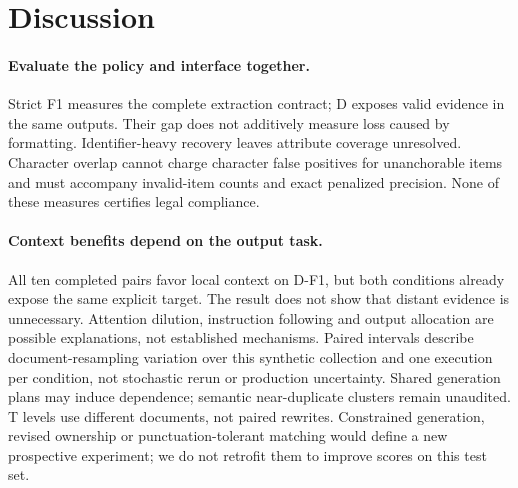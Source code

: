 \section{Discussion}
\label{sec:discussion}

\paragraph{Evaluate the policy and interface together.}
Strict F1 measures the complete extraction contract; D exposes valid
evidence in the same outputs. Their gap does not additively measure loss
caused by formatting. Identifier-heavy recovery leaves attribute coverage
unresolved. Character overlap cannot charge character false positives for
unanchorable items and must accompany invalid-item counts and exact
penalized precision. None of these measures certifies legal compliance.

\paragraph{Context benefits depend on the output task.}
All ten completed pairs favor local context on D-F1, but both conditions
already expose the same explicit target. The result does not show that
distant evidence is unnecessary. Attention dilution, instruction following
and output allocation are possible explanations, not established mechanisms.
Paired intervals describe document-resampling variation over this synthetic
collection and one execution per condition, not stochastic rerun or
production uncertainty. Shared generation plans may induce dependence;
semantic near-duplicate clusters remain unaudited. T levels use different
documents, not paired rewrites. Constrained generation, revised ownership
or punctuation-tolerant matching would define a new prospective experiment;
we do not retrofit them to improve scores on this test set.

